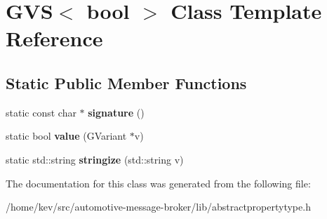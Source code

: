 \hypertarget{classGVS_3_01bool_01_4}{\section{G\+V\+S$<$ bool $>$ Class Template Reference}
\label{classGVS_3_01bool_01_4}
}
\subsection*{Static Public Member Functions}
\begin{DoxyCompactItemize}
\item 
\hypertarget{classGVS_3_01bool_01_4_a81cb01e07ccf7830cce75abcc4a2cca8}{static const char $\ast$ {\bfseries signature} ()}\label{classGVS_3_01bool_01_4_a81cb01e07ccf7830cce75abcc4a2cca8}

\item 
\hypertarget{classGVS_3_01bool_01_4_affd787db6c549ec8bee51862fc51f211}{static bool {\bfseries value} (G\+Variant $\ast$v)}\label{classGVS_3_01bool_01_4_affd787db6c549ec8bee51862fc51f211}

\item 
\hypertarget{classGVS_3_01bool_01_4_a3f5e4da1a15517ae3e700c3a1b70fea7}{static std\+::string {\bfseries stringize} (std\+::string v)}\label{classGVS_3_01bool_01_4_a3f5e4da1a15517ae3e700c3a1b70fea7}

\end{DoxyCompactItemize}


The documentation for this class was generated from the following file\+:\begin{DoxyCompactItemize}
\item 
/home/kev/src/automotive-\/message-\/broker/lib/abstractpropertytype.\+h\end{DoxyCompactItemize}
